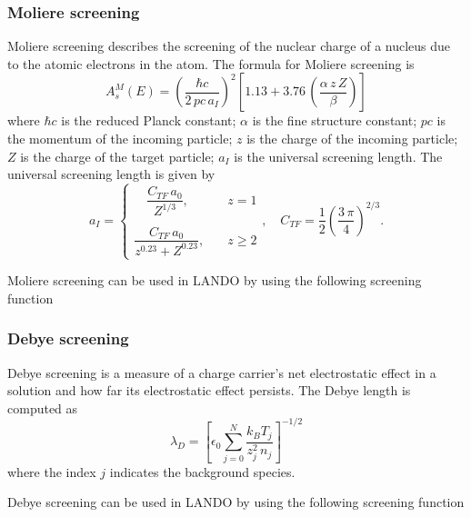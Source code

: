 \subsubsection{Moliere screening}
Moliere screening describes the screening of the nuclear charge of a nucleus due to the atomic electrons in the atom. The formula for Moliere screening is
\begin{equation}
    A_s^M(E) = \left( \dfrac{\hbar c}{2 \, pc \, a_I}\right)^2 \left[ 1.13 + 3.76  \, \left( \dfrac{\alpha \, z \, Z}{\beta}\right)\right]
\end{equation}
where $\hbar c$ is the reduced Planck constant; $\alpha$ is the fine structure constant; $pc$ is the momentum of the incoming particle; $z$ is the charge of the incoming particle; $Z$ is the charge of the target particle; $a_I$ is the universal screening length. The universal screening length is given by
\begin{equation}
    a_I = 
    \begin{cases}
        \quad \dfrac{C_{TF} \, a_0}{Z^{1/3}}, \quad\quad &z = 1 \\\\
        \dfrac{C_{TF} \, a_0}{z^{0.23} + Z^{0.23}}, \quad &z \geq 2
    \end{cases}, \quad
    C_{TF} = \dfrac{1}{2} \left( \dfrac{3 \, \pi}{4}\right)^{2/3}.
\end{equation}

Moliere screening can be used in LANDO by using the following screening function

\subsubsection{Debye screening}
Debye screening is a measure of a charge carrier's net electrostatic effect in a solution and how far its electrostatic effect persists. The Debye length is computed as
\begin{equation}
    \lambda_D = \left[ \epsilon_0 \sum_{j=0}^N \dfrac{k_B T_j}{z_j^2 \, n_j} \right]^{-1/2}
\end{equation}
where the index $j$ indicates the background species.

Debye screening can be used in LANDO by using the following screening function

